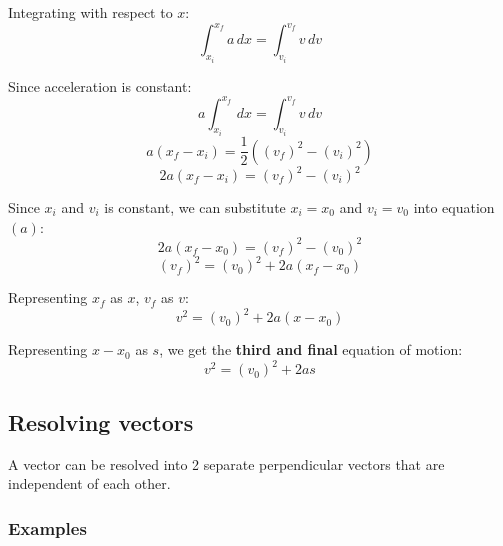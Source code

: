 \documentclass[11pt]{article}
\begin{document}
Integrating with respect to \(x\):
\[\int_{x_i}^{x_f} a \, dx = \int_{v_i}^{v_f} v \, dv\]

Since acceleration is constant:
\[a \int_{x_i}^{x_f} \, dx = \int_{v_i}^{v_f} v \, dv\]
\[a(x_f - x_i) = \frac{1}{2}((v_f)^2 - (v_i)^2)\]
\[2a(x_f - x_i) = (v_f)^2 - (v_i)^2 \tag{a}\]

Since \(x_i\) and \(v_i\) is constant, we can substitute \(x_i = x_0\) and \(v_i = v_0\) into equation \((a)\):
\[2a(x_f - x_0) = (v_f)^2 - (v_0)^2\]
\[(v_f)^2 = (v_0)^2 + 2a(x_f - x_0)\]

Representing \(x_f\) as \(x\), \(v_f\) as \(v\):
\[v^2 = (v_0)^2 + 2a(x - x_0)\]

Representing \(x - x_0\) as \(s\), we get the \textbf{third and final} equation of motion:
\[v^2 = (v_0)^2 + 2as \tag{3}\]

\newpage

\subsection{Resolving vectors}
\label{sec:orgbdd563c}
A vector can be resolved into 2 separate perpendicular vectors that are independent of each other.

\subsubsection{Examples}
\label{sec:org5be6e8c}
\end{document}
